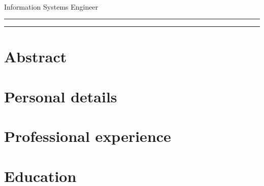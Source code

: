 \documentclass[10pt,a4paper]{article}
\begin{document}
\thispagestyle{empty}

\begin{flushright}
    \huge{\textbf{\name}} \\
    \large{Information Systems Engineer}
\end{flushright}
\hrule
\bigskip



\bigskip
\hrule

\bigskip

\section*{Abstract}


\section*{Personal details}


\section*{Professional experience}


\section*{Education}

\end{document}
